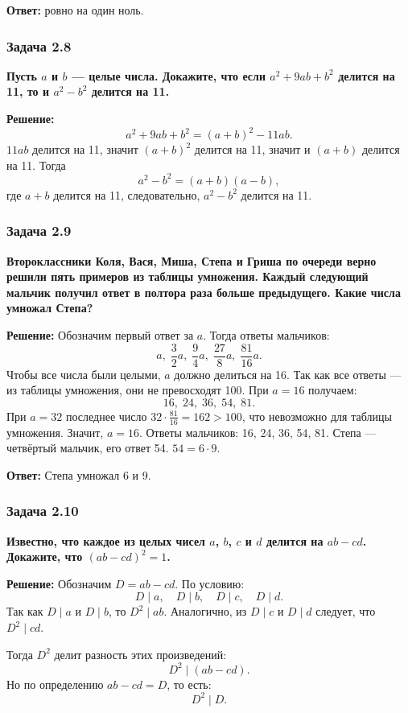 \documentclass[12pt, a4paper]{article}
\begin{document}
\textbf{Ответ:} ровно на один ноль.

\subsubsection*{Задача 2.8}
\textbf{Пусть $a$ и $b$ — целые числа. Докажите, что если $a^2 + 9ab + b^2$ делится на 11, то и $a^2 - b^2$ делится на 11.}

\textbf{Решение:}
\[
a^2 + 9ab + b^2 = (a+b)^2 - 11ab.
\]
$11ab$ делится на 11, значит $(a+b)^2$ делится на 11, значит и $(a+b)$ делится на 11. Тогда
\[
a^2 - b^2 = (a+b)(a-b),
\]
где $a+b$ делится на 11, следовательно, $a^2 - b^2$ делится на 11.

\subsubsection*{Задача 2.9}
\textbf{Второклассники Коля, Вася, Миша, Степа и Гриша по очереди верно решили пять примеров из таблицы умножения. Каждый следующий мальчик получил ответ в полтора раза больше предыдущего. Какие числа умножал Степа?}

\textbf{Решение:}
Обозначим первый ответ за $a$. Тогда ответы мальчиков:
\[
a,\; \frac{3}{2}a,\; \frac{9}{4}a,\; \frac{27}{8}a,\; \frac{81}{16}a.
\]
Чтобы все числа были целыми, $a$ должно делиться на 16. Так как все ответы — из таблицы умножения, они не превосходят 100. При $a = 16$ получаем:
\[
16,\; 24,\; 36,\; 54,\; 81.
\]
При $a = 32$ последнее число $32 \cdot \frac{81}{16} = 162 > 100$, что невозможно для таблицы умножения. Значит, $a = 16$. Ответы мальчиков: 16, 24, 36, 54, 81. Степа — четвёртый мальчик, его ответ 54. $54 = 6 \cdot 9$.

\textbf{Ответ:} Степа умножал 6 и 9.

\subsubsection*{Задача 2.10}
\textbf{Известно, что каждое из целых чисел $a$, $b$, $c$ и $d$ делится на $ab - cd$. Докажите, что $(ab - cd)^2 = 1$.}

\textbf{Решение:}
Обозначим $D = ab - cd$. По условию:
\[
D \mid a, \quad D \mid b, \quad D \mid c, \quad D \mid d.
\]
Так как $D \mid a$ и $D \mid b$, то $D^2 \mid ab$. Аналогично, из $D \mid c$ и $D \mid d$ следует, что $D^2 \mid cd$. 

Тогда $D^2$ делит разность этих произведений:
\[
D^2 \mid (ab - cd).
\]
Но по определению $ab - cd = D$, то есть:
\[
D^2 \mid D.
\]
\end{document}
